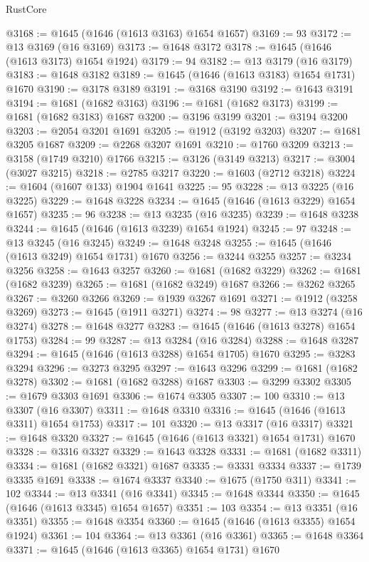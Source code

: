 \begin{lexlean}{RustCore}
\begin{coremodule}
@3168 := @1645 (@1646 (@1613 @3163) @1654 @1657)
@3169 := 93
@3172 := @13 @3169 (@16 @3169)
@3173 := @1648 @3172
@3178 := @1645 (@1646 (@1613 @3173) @1654 @1924)
@3179 := 94
@3182 := @13 @3179 (@16 @3179)
@3183 := @1648 @3182
@3189 := @1645 (@1646 (@1613 @3183) @1654 @1731) @1670
@3190 := @3178 @3189
@3191 := @3168 @3190
@3192 := @1643 @3191
@3194 := @1681 (@1682 @3163)
@3196 := @1681 (@1682 @3173)
@3199 := @1681 (@1682 @3183) @1687
@3200 := @3196 @3199
@3201 := @3194 @3200
@3203 := @2054 @3201 @1691
@3205 := @1912 (@3192 @3203)
@3207 := @1681 @3205 @1687
@3209 := @2268 @3207 @1691
@3210 := @1760 @3209
@3213 := @3158 (@1749 @3210) @1766
@3215 := @3126 (@3149 @3213)
@3217 := @3004 (@3027 @3215)
@3218 := @2785 @3217
@3220 := @1603 (@2712 @3218)
@3224 := @1604 (@1607 @133) @1904 @1641
@3225 := 95
@3228 := @13 @3225 (@16 @3225)
@3229 := @1648 @3228
@3234 := @1645 (@1646 (@1613 @3229) @1654 @1657)
@3235 := 96
@3238 := @13 @3235 (@16 @3235)
@3239 := @1648 @3238
@3244 := @1645 (@1646 (@1613 @3239) @1654 @1924)
@3245 := 97
@3248 := @13 @3245 (@16 @3245)
@3249 := @1648 @3248
@3255 := @1645 (@1646 (@1613 @3249) @1654 @1731) @1670
@3256 := @3244 @3255
@3257 := @3234 @3256
@3258 := @1643 @3257
@3260 := @1681 (@1682 @3229)
@3262 := @1681 (@1682 @3239)
@3265 := @1681 (@1682 @3249) @1687
@3266 := @3262 @3265
@3267 := @3260 @3266
@3269 := @1939 @3267 @1691
@3271 := @1912 (@3258 @3269)
@3273 := @1645 (@1911 @3271)
@3274 := 98
@3277 := @13 @3274 (@16 @3274)
@3278 := @1648 @3277
@3283 := @1645 (@1646 (@1613 @3278) @1654 @1753)
@3284 := 99
@3287 := @13 @3284 (@16 @3284)
@3288 := @1648 @3287
@3294 := @1645 (@1646 (@1613 @3288) @1654 @1705) @1670
@3295 := @3283 @3294
@3296 := @3273 @3295
@3297 := @1643 @3296
@3299 := @1681 (@1682 @3278)
@3302 := @1681 (@1682 @3288) @1687
@3303 := @3299 @3302
@3305 := @1679 @3303 @1691
@3306 := @1674 @3305
@3307 := 100
@3310 := @13 @3307 (@16 @3307)
@3311 := @1648 @3310
@3316 := @1645 (@1646 (@1613 @3311) @1654 @1753)
@3317 := 101
@3320 := @13 @3317 (@16 @3317)
@3321 := @1648 @3320
@3327 := @1645 (@1646 (@1613 @3321) @1654 @1731) @1670
@3328 := @3316 @3327
@3329 := @1643 @3328
@3331 := @1681 (@1682 @3311)
@3334 := @1681 (@1682 @3321) @1687
@3335 := @3331 @3334
@3337 := @1739 @3335 @1691
@3338 := @1674 @3337
@3340 := @1675 (@1750 @311)
@3341 := 102
@3344 := @13 @3341 (@16 @3341)
@3345 := @1648 @3344
@3350 := @1645 (@1646 (@1613 @3345) @1654 @1657)
@3351 := 103
@3354 := @13 @3351 (@16 @3351)
@3355 := @1648 @3354
@3360 := @1645 (@1646 (@1613 @3355) @1654 @1924)
@3361 := 104
@3364 := @13 @3361 (@16 @3361)
@3365 := @1648 @3364
@3371 := @1645 (@1646 (@1613 @3365) @1654 @1731) @1670

\end{coremodule}
\end{lexlean}
